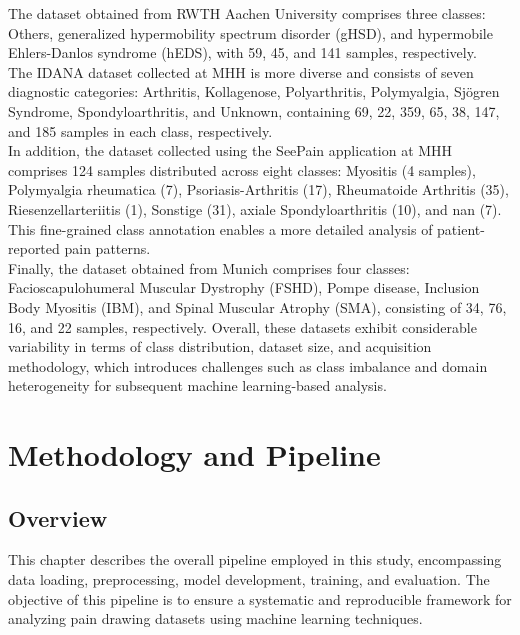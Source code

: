 \documentclass[12pt]{report}
\begin{document}
The dataset obtained from RWTH Aachen University comprises three classes: Others, generalized hypermobility spectrum disorder (gHSD), and hypermobile Ehlers-Danlos syndrome (hEDS), with 59, 45, and 141 samples, respectively.\\

The IDANA dataset collected at MHH is more diverse and consists of seven diagnostic categories: Arthritis, Kollagenose, Polyarthritis, Polymyalgia, Sjögren Syndrome, Spondyloarthritis, and Unknown, containing 69, 22, 359, 65, 38, 147, and 185 samples in each class, respectively.\\

In addition, the dataset collected using the SeePain application at MHH comprises 124 samples distributed across eight classes: Myositis (4 samples), Polymyalgia rheumatica (7), Psoriasis-Arthritis (17), Rheumatoide Arthritis (35), Riesenzellarteriitis (1), Sonstige (31), axiale Spondyloarthritis (10), and nan (7). This fine-grained class annotation enables a more detailed analysis of patient-reported pain patterns.\\

Finally, the dataset obtained from Munich comprises four classes: Facioscapulohumeral Muscular Dystrophy (FSHD), Pompe disease, Inclusion Body Myositis (IBM), and Spinal Muscular Atrophy (SMA), consisting of 34, 76, 16, and 22 samples, respectively. Overall, these datasets exhibit considerable variability in terms of class distribution, dataset size, and acquisition methodology, which introduces challenges such as class imbalance and domain heterogeneity for subsequent machine learning-based analysis.





\chapter{Methodology and Pipeline}

\section{Overview}

This chapter describes the overall pipeline employed in this study, encompassing data loading, preprocessing, model development, training, and evaluation. The objective of this pipeline is to ensure a systematic and reproducible framework for analyzing pain drawing datasets using machine learning techniques.
\end{document}
